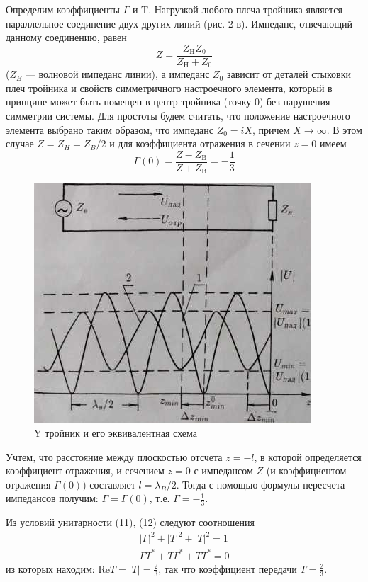 ﻿\documentclass[a4paper,11pt]{article}
\begin{document}
Определим коэффициенты $\Gamma$ и $\mathrm { T }$. Нагрузкой любого плеча тройника является параллельное соединение двух других линий (рис. 2 в). Импеданс, отвечающий данному соединению, равен 
\begin{equation*}
	Z = \frac { Z _ { \mathrm { H } } Z _ { 0 } } { Z _ { \mathrm { H } } + Z _ { 0 } }
\end{equation*}
($Z_B$ --- волновой импеданс линии), а импеданс $Z_0$ зависит от деталей стыковки плеч тройника и свойств симметричного настроечного элемента, который в принципе может быть помещен в центр тройника (точку 0) без нарушения симметрии системы. 
Для простоты будем считать, что положение настроечного элемента выбрано таким образом, что импеданс $Z_0=iX$, причем $X\to\infty$. В этом случае $Z = Z_H = Z_B/2$ и для коэффициента
отражения в сечении $z=0$ имеем
\begin{equation}
	\Gamma ( 0 ) = \frac { Z - Z _ { \mathrm { B } } } { Z + Z _ { \mathrm { B } } } = - \frac { 1 } { 3 }
\end{equation}

\begin{figure}[h!]
	\centering
	\includegraphics[]{img/2.jpg}
	\caption{Y тройник и его эквивалентная схема}
	\label{fig:fig2}
\end{figure}


Учтем, что расстояние между плоскостью отсчета $z=-l$, в которой определяется коэффициент отражения, и сечением $z=0$ с импедансом $Z$ (и коэффициентом отражения $\Gamma(0)$) составляет $l=\lambda_B/2$. 
Тогда с помощью формулы пересчета импедансов получим:  $\Gamma = \Gamma(0)$, т.е.  $\Gamma=-\frac13$.

Из условий унитарности (11), (12) следуют соотношения
\begin{equation}
	\begin{array} { c } { | \Gamma | ^ { 2 } + | T | ^ { 2 } + | T | ^ { 2 } = 1 } \\ { \Gamma T ^ { * } + T \Gamma ^ { * } + T T ^ { * } = 0 } \end{array}
\end{equation}
из которых находим: $\mathrm{Re} T = |T| = \frac23$, так что коэффициент передачи $T=\frac23$.
\end{document}
